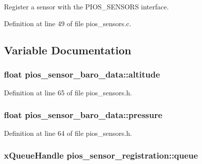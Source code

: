 \-Register a sensor with the \-P\-I\-O\-S\-\_\-\-S\-E\-N\-S\-O\-R\-S interface. 



\-Definition at line 49 of file pios\-\_\-sensors.\-c.



\subsection{\-Variable \-Documentation}
\hypertarget{group___p_i_o_s___s_e_n_s_o_r_s_ga36e1ee62fc132c0b2c992ef8efc5bb81}{
\subsubsection[{altitude}]{\setlength{\rightskip}{0pt plus 5cm}float {\bf pios\-\_\-sensor\-\_\-baro\-\_\-data\-::altitude}}}\label{group___p_i_o_s___s_e_n_s_o_r_s_ga36e1ee62fc132c0b2c992ef8efc5bb81}


\-Definition at line 65 of file pios\-\_\-sensors.\-h.

\hypertarget{group___p_i_o_s___s_e_n_s_o_r_s_ga43ba219138a0c31669a1af1b45f7a7f6}{
\subsubsection[{pressure}]{\setlength{\rightskip}{0pt plus 5cm}float {\bf pios\-\_\-sensor\-\_\-baro\-\_\-data\-::pressure}}}\label{group___p_i_o_s___s_e_n_s_o_r_s_ga43ba219138a0c31669a1af1b45f7a7f6}


\-Definition at line 64 of file pios\-\_\-sensors.\-h.

\hypertarget{group___p_i_o_s___s_e_n_s_o_r_s_gaeea1102e8510b8a5f3bb0cf298e7ebea}{
\subsubsection[{queue}]{\setlength{\rightskip}{0pt plus 5cm}x\-Queue\-Handle {\bf pios\-\_\-sensor\-\_\-registration\-::queue}}}\label{group___p_i_o_s___s_e_n_s_o_r_s_gaeea1102e8510b8a5f3bb0cf298e7ebea}



